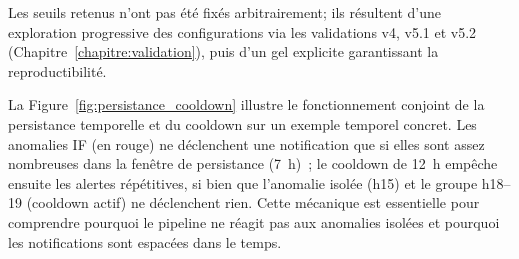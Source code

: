 Les seuils retenus n'ont pas été fixés arbitrairement; ils résultent d'une exploration progressive
des configurations via les validations v4, v5.1 et v5.2 (Chapitre~\ref{chapitre:validation}),
puis d'un gel explicite garantissant la reproductibilité.

La Figure~\ref{fig:persistance_cooldown} illustre le fonctionnement conjoint de la
persistance temporelle et du cooldown sur un exemple temporel concret. Les anomalies IF
(en rouge) ne déclenchent une notification que si elles sont assez nombreuses dans la
fenêtre de persistance (7~h)~; le cooldown de 12~h empêche ensuite les alertes
répétitives, si bien que l'anomalie isolée (h15) et le groupe h18--19 (cooldown actif)
ne déclenchent rien. Cette mécanique est essentielle pour comprendre pourquoi le
pipeline ne réagit pas aux anomalies isolées et pourquoi les notifications sont espacées
dans le temps.

